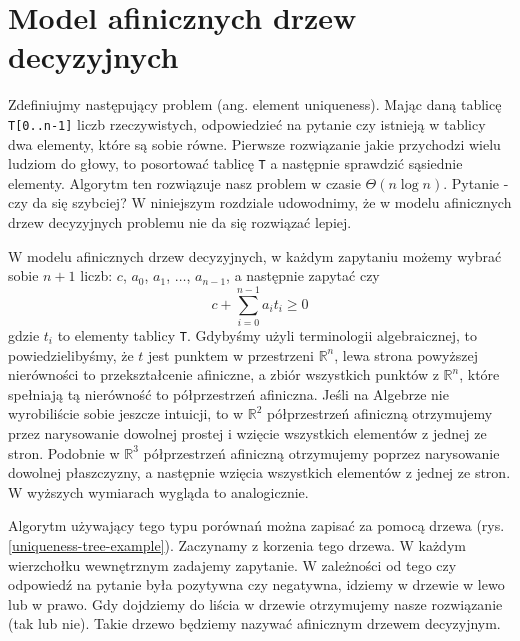 \section{Model afinicznych drzew decyzyjnych}

\label{sec:elementuniqueness}

Zdefiniujmy następujący problem (ang. element uniqueness).
Mając daną tablicę \texttt{T[0..n-1]} liczb rzeczywistych, odpowiedzieć na pytanie czy istnieją w tablicy dwa elementy, które są sobie równe.
Pierwsze rozwiązanie jakie przychodzi wielu ludziom do głowy, to posortować tablicę \texttt{T} a następnie sprawdzić sąsiednie elementy.
Algorytm ten rozwiązuje nasz problem w czasie $\Theta(n \log n)$.
Pytanie - czy da się szybciej?
W niniejszym rozdziale udowodnimy, że w modelu afinicznych drzew decyzyjnych problemu nie da się rozwiązać lepiej.

W modelu afinicznych drzew decyzyjnych, w każdym zapytaniu możemy wybrać sobie $n+1$ liczb: $c$, $a_0$, $a_1$, $\dots$, $a_{n-1}$, a następnie zapytać czy
\[
 c + \sum_{i=0}^{n-1} a_i t_i \geq 0
\]
gdzie $t_i$ to elementy tablicy \texttt{T}.
Gdybyśmy użyli terminologii algebraicznej, to powiedzielibyśmy, że $t$ jest punktem w przestrzeni $\mathbb{R}^n$, lewa strona powyższej nierówności to przekształcenie afiniczne,
a zbiór wszystkich punktów z $\mathbb{R}^n$, które spełniają tą nierówność to półprzestrzeń afiniczna.
Jeśli na Algebrze nie wyrobiliście sobie jeszcze intuicji, to w $\mathbb{R}^2$ półprzestrzeń afiniczną otrzymujemy przez narysowanie dowolnej prostej i wzięcie wszystkich elementów z jednej ze stron.
Podobnie w $\mathbb{R}^3$ półprzestrzeń afiniczną otrzymujemy poprzez narysowanie dowolnej płaszczyzny, a następnie wzięcia wszystkich elementów z jednej ze stron.
W wyższych wymiarach wygląda to analogicznie.

Algorytm używający tego typu porównań można zapisać za pomocą drzewa (rys. \ref{uniqueness-tree-example}).
Zaczynamy z korzenia tego drzewa.
W każdym wierzchołku wewnętrznym zadajemy zapytanie.
W zależności od tego czy odpowiedź na pytanie była pozytywna czy negatywna, idziemy w drzewie w lewo lub w prawo.
Gdy dojdziemy do liścia w drzewie otrzymujemy nasze rozwiązanie (tak lub nie).
Takie drzewo będziemy nazywać afinicznym drzewem decyzyjnym.

